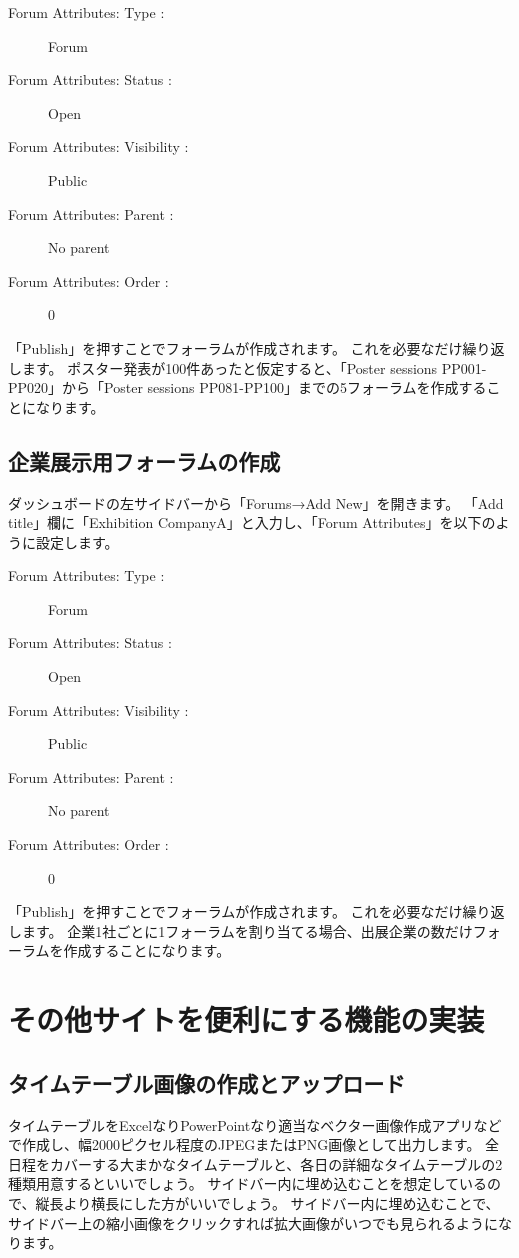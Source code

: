 \documentclass[titlepage,10pt,a4paper,uplatex]{jsbook}
\begin{document}
\begin{description}
\item[Forum Attributes: Type : ] Forum
\item[Forum Attributes: Status : ] Open
\item[Forum Attributes: Visibility : ] Public
\item[Forum Attributes: Parent : ] No parent
\item[Forum Attributes: Order : ] 0
\end{description}

「Publish」を押すことでフォーラムが作成されます。
これを必要なだけ繰り返します。
ポスター発表が100件あったと仮定すると、「Poster sessions PP001-PP020」から「Poster sessions PP081-PP100」までの5フォーラムを作成することになります。

\subsection{企業展示用フォーラムの作成}

ダッシュボードの左サイドバーから「Forums→Add New」を開きます。
「Add title」欄に「Exhibition CompanyA」と入力し、「Forum Attributes」を以下のように設定します。

\begin{description}
\item[Forum Attributes: Type : ] Forum
\item[Forum Attributes: Status : ] Open
\item[Forum Attributes: Visibility : ] Public
\item[Forum Attributes: Parent : ] No parent
\item[Forum Attributes: Order : ] 0
\end{description}

「Publish」を押すことでフォーラムが作成されます。
これを必要なだけ繰り返します。
企業1社ごとに1フォーラムを割り当てる場合、出展企業の数だけフォーラムを作成することになります。

\section{その他サイトを便利にする機能の実装}

\subsection{タイムテーブル画像の作成とアップロード}

タイムテーブルをExcelなりPowerPointなり適当なベクター画像作成アプリなどで作成し、幅2000ピクセル程度のJPEGまたはPNG画像として出力します。
全日程をカバーする大まかなタイムテーブルと、各日の詳細なタイムテーブルの2種類用意するといいでしょう。
サイドバー内に埋め込むことを想定しているので、縦長より横長にした方がいいでしょう。
サイドバー内に埋め込むことで、サイドバー上の縮小画像をクリックすれば拡大画像がいつでも見られるようになります。
\end{document}
